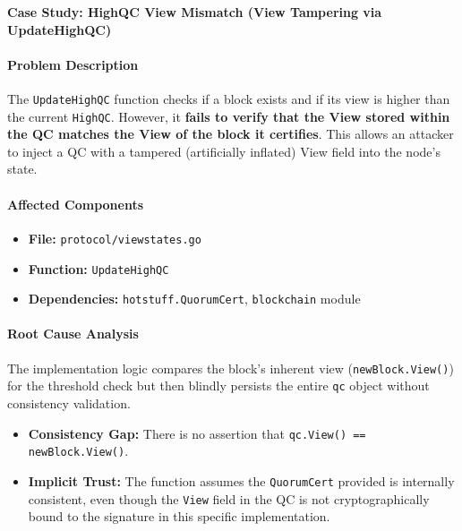 \documentclass{article}
\theoremstyle{plain}
\theoremstyle{definition}
\theoremstyle{remark}
\begin{document}
{
\textbf{Case Study: HighQC View Mismatch (View Tampering via UpdateHighQC)}

\paragraph{Problem Description}
The \texttt{UpdateHighQC} function checks if a block exists and if its view is higher than the current \texttt{HighQC}. However, it \textbf{fails to verify that the View stored within the QC matches the View of the block it certifies}. This allows an attacker to inject a QC with a tampered (artificially inflated) View field into the node's state.

\paragraph{Affected Components}
\begin{itemize}
    \item \textbf{File:} \texttt{protocol/viewstates.go}
    \item \textbf{Function:} \texttt{UpdateHighQC}
    \item \textbf{Dependencies:} \texttt{hotstuff.QuorumCert}, \texttt{blockchain} module
\end{itemize}

\paragraph{Root Cause Analysis}
The implementation logic compares the block's inherent view (\texttt{newBlock.View()}) for the threshold check but then blindly persists the entire \texttt{qc} object without consistency validation. 
\begin{itemize}
    \item \textbf{Consistency Gap:} There is no assertion that \texttt{qc.View() == newBlock.View()}.
    \item \textbf{Implicit Trust:} The function assumes the \texttt{QuorumCert} provided is internally consistent, even though the \texttt{View} field in the QC is not cryptographically bound to the signature in this specific implementation.
\end{itemize}



}
\end{document}
